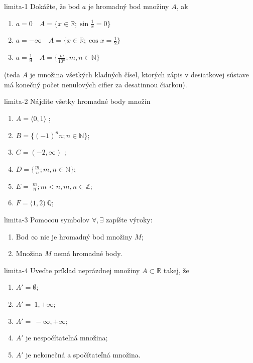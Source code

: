 \begin{defproblem}{limita-1}
Dokážte, že bod $a$ je hromadný bod množiny $A$, ak
	
\begin{enumerate}
	\item $a=0 \quad A=\{x \in \mathbb{R}; \sin{\frac{1}{x}} = 0 \}$
	\item $a=-\infty \quad A=\{x \in \mathbb{R}; \cos{x} = \frac{1}{2} \}$ 
	\item $a=\frac{1}{9} \quad A=\{\frac{m}{10^n}; m,n \in \mathbb{N} \}$
\end{enumerate}
	
(teda $A$ je množina všetkých kladných čísel, ktorých zápis v desiatkovej sústave má konečný počet nenulových cifier za desatinnou čiarkou).
	
\end{defproblem}

\begin{defproblem}{limita-2}
Nájdite všetky hromadné body množín
\begin{multicols}{2}
\begin{enumerate}
\item $A= \langle 0,1 \rangle$ ;
\item $B= \{ (-1)^n n; n\in \mathbb{N} \} $;
\item $C= (-2,\infty)$ ;
\item $D= \{\frac{m}{n}; m,n \in \mathbb{N} \}$;
\item $E= {\ \frac{m}{n}; m<n,m,n \in \mathbb{Z}}$;
\item $F= \langle 1,2 ) \ \mathbb{Q}$;
\end{enumerate}
\end{multicols}
\end{defproblem}

\begin{defproblem}{limita-3}
Pomocou symbolov $\forall,\exists$ zapíšte výroky:
\begin{enumerate}
\item Bod $\infty$ nie je hromadný bod množiny $M$;
\item Množina $M$ nemá hromadné body.
\end{enumerate}
\end{defproblem}

\begin{defproblem}{limita-4}
Uveďte príklad neprázdnej množiny $A \subset \mathbb{R}$ takej, že
\begin{enumerate}
\item $A'=\emptyset$;
\item $A'={\ 1, +\infty}$;
\item $A'={\ -\infty,+\infty}$;
\item $A'$ je nespočítateľná množina;
\item $A'$ je nekonečná a spočítateľná množina.
\end{enumerate}
\end{defproblem}

